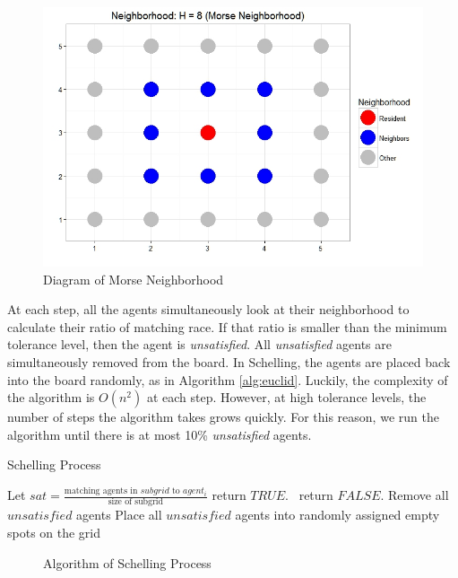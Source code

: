 {\begin{figure}[h!]
\centering
\includegraphics[scale=.33]{figures/H8.jpeg}
\caption{Diagram of Morse Neighborhood}
\label{fig:morse}
\end{figure}

At each step, all the agents simultaneously look at their neighborhood to calculate their ratio of matching race. If that ratio is smaller than the minimum tolerance level, then the agent is \textit{unsatisfied}. All \textit{unsatisfied} agents are simultaneously removed from the board. In Schelling, the agents are placed back into the board randomly, as in Algorithm \ref{alg:euclid}. Luckily, the complexity of the algorithm is $O(n^2)$ at each step. However, at high tolerance levels, the number of steps the algorithm takes grows quickly. For this reason, we run the algorithm until there is at most 10\% \textit{unsatisfied} agents.

 \begin{algorithm}[h!]
  \caption{Schelling Process}\label{alg:euclid}
  \begin{algorithmic}[1]
        	\State Let $sat = \frac{\text{matching agents in $subgrid$ to $agent_i$}}{\text{size of subgrid}}$
       			\State return $TRUE$. 
                \Else \ return $FALSE$. 
    		\EndIf
        \EndProcedure
        	\State Remove all $unsatisfied$ agents
            \State Place all $unsatisfied$ agents into randomly assigned empty spots on the grid
        \EndWhile{}
  	\EndFunction{}
  \end{algorithmic}
  \end{algorithm}
  \begin{figure}[h!]
  \caption{Algorithm of Schelling Process}
\end{figure}

}
